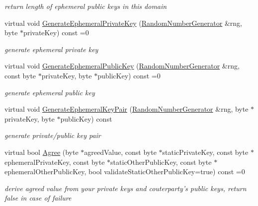 \begin{DoxyCompactItemize}
\begin{DoxyCompactList}\small\item\em return length of ephemeral public keys in this domain \item\end{DoxyCompactList}\item 
virtual void \hyperlink{class_authenticated_key_agreement_domain_ab6280d3bf8ad1dd2aa976910b81502f8}{GenerateEphemeralPrivateKey} (\hyperlink{class_random_number_generator}{RandomNumberGenerator} \&rng, byte $\ast$privateKey) const =0
\begin{DoxyCompactList}\small\item\em generate ephemeral private key \item\end{DoxyCompactList}\item 
virtual void \hyperlink{class_authenticated_key_agreement_domain_a9d1bc83a77f44af6616da42c33b3bc49}{GenerateEphemeralPublicKey} (\hyperlink{class_random_number_generator}{RandomNumberGenerator} \&rng, const byte $\ast$privateKey, byte $\ast$publicKey) const =0
\begin{DoxyCompactList}\small\item\em generate ephemeral public key \item\end{DoxyCompactList}\item 
virtual void \hyperlink{class_authenticated_key_agreement_domain_aafe38894865a6f11c3282c8aa94df29e}{GenerateEphemeralKeyPair} (\hyperlink{class_random_number_generator}{RandomNumberGenerator} \&rng, byte $\ast$privateKey, byte $\ast$publicKey) const 
\begin{DoxyCompactList}\small\item\em generate private/public key pair \item\end{DoxyCompactList}\item 
virtual bool \hyperlink{class_authenticated_key_agreement_domain_ac9808fb56eacee0c08a9bbd22fe2c98e}{Agree} (byte $\ast$agreedValue, const byte $\ast$staticPrivateKey, const byte $\ast$ephemeralPrivateKey, const byte $\ast$staticOtherPublicKey, const byte $\ast$ephemeralOtherPublicKey, bool validateStaticOtherPublicKey=true) const =0
\begin{DoxyCompactList}\small\item\em derive agreed value from your private keys and couterparty's public keys, return false in case of failure \item\end{DoxyCompactList}\end{DoxyCompactItemize}



